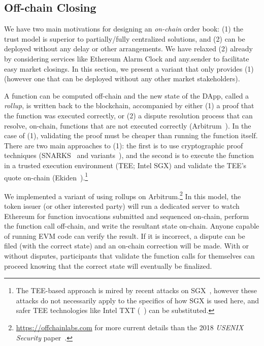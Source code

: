 
\subsection{Off-chain Closing}
\label{sec:rollups}

We have two main motivations for designing an \textit{on-chain} order book: (1) the trust model is superior to partially/fully centralized solutions, and (2) \cm can be deployed without any delay or other arrangements. We have relaxed (2) already by considering services like Ethereum Alarm Clock and any.sender to facilitate easy market closings. In this section, we present a variant that only provides (1) (however one that can be deployed without any other market stakeholders). 

A function can be computed off-chain and the new state of the DApp, called a \textit{rollup}, is written back to the blockchain, accompanied by either (1) a proof that the function was executed correctly, or (2) a dispute resolution process that can resolve, on-chain, functions that are not executed correctly (\eg Arbitrum~\cite{kalodner2018arbitrum}). In the case of (1), validating the proof must be cheaper than running the function itself. There are two main approaches to (1): the first is to use cryptographic proof techniques (\eg SNARKS~\cite{BCGTV13,GGPR13} and variants~\cite{BBHR19}), and the second is to execute the function in a trusted execution environment (TEE; \eg Intel SGX) and validate the TEE's quote on-chain (\eg Ekiden~\cite{cheng2019ekiden}).\footnote{The TEE-based approach is mired by recent attacks on SGX~\cite{SGX1,SGX2,SGX3,SGX4}, however these attacks do not necessarily apply to the specifics of how SGX is used here, and safer TEE technologies like Intel TXT (\cf~\cite{ZBC+19}) can be substituted.}

We implemented a variant of \cm using rollups on Arbitrum.\footnote{\url{https://offchainlabs.com} for more current details than the 2018 \textit{USENIX Security} paper~\cite{kalodner2018arbitrum}.} In this model, the token issuer (or other interested party) will run a dedicated server to watch Ethereum for function invocations submitted and sequenced on-chain, perform the function call off-chain, and write the resultant state on-chain. Anyone capable of running EVM code can verify the result. If it is incorrect, a dispute can be filed (with the correct state) and an on-chain correction will be made. With or without disputes, participants that validate the function calls for themselves can proceed knowing that the correct state will eventually be finalized. 

